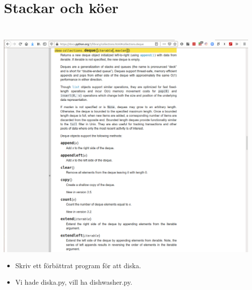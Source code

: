 \mode*

\section{Stackar och köer}

\begin{frame}[fragile]
  \begin{example}[pile.py]
    \inputminted{python}{examples/pile.py}
  \end{example}
\end{frame}

\begin{frame}[fragile]
  \begin{example}[queue.py]
    \inputminted{python}{examples/queue.py}
  \end{example}
\end{frame}

\begin{frame}
  \includegraphics[width=\columnwidth]{figs/docs-deque.png}
\end{frame}

\begin{frame}[fragile]
  \begin{exercise}
    \begin{itemize}
      \item Skriv ett förbättrat program för att diska.
      \item Vi hade diska.py, vill ha dishwasher.py.
    \end{itemize}
  \end{exercise}
\end{frame}


